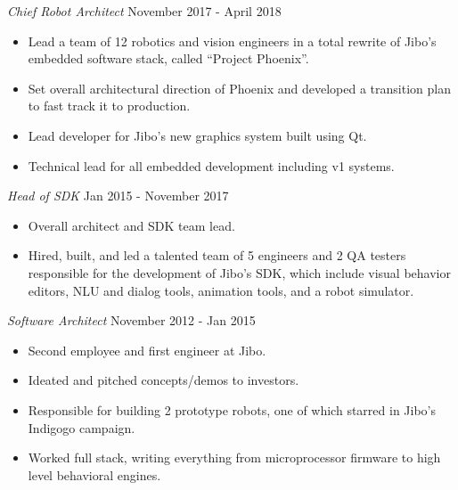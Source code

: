 \documentclass[a4paper]{article}
\begin{document}
\begin{addmargin}[1em]{0em}
\begin{itemize}
    \end{itemize}
    \textit{Chief Robot Architect} \hfill November 2017 - April 2018\\
    \vspace{-1mm}
    \begin{itemize} \itemsep 1pt
        \item Lead a team of 12 robotics and vision engineers in a total rewrite of 
            Jibo's embedded software stack, called ``Project Phoenix''.
        \item Set overall architectural direction of Phoenix and developed
            a transition plan to fast track it to production.
        \item Lead developer for Jibo's new graphics system built using Qt.
        \item Technical lead for all embedded development including v1 systems.
    \end{itemize}
    \textit{Head of SDK} \hfill Jan 2015 - November 2017\\
    \vspace{-1mm}
    \begin{itemize} \itemsep 1pt
        \item Overall architect and SDK team lead.
        \item Hired, built, and led a talented team of 5 engineers and 2 QA testers 
            responsible for the development of Jibo’s SDK, which include visual behavior 
            editors, NLU and dialog tools, animation tools, and a robot simulator.
    \end{itemize}

    \pagebreak[3]

    \textit{Software Architect} \hfill November 2012 - Jan 2015\\
    \vspace{-1mm}
    \begin{itemize} \itemsep 1pt
        \item Second employee and first engineer at Jibo.
        \item Ideated and pitched concepts/demos to investors.
        \item Responsible for building 2 prototype robots, one of which starred in Jibo's
            Indigogo campaign.
        \item Worked full stack, writing everything from microprocessor firmware to 
            high level behavioral engines.
    \end{itemize}
\end{addmargin}
\end{document}
